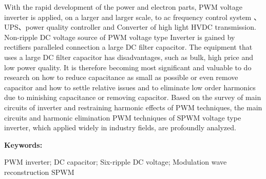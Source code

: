     
\newpage
     \thispagestyle{fancy}
    \begin{enabstract}
        \begin{spacing}{1.5}
            \justify
          \qquad With the rapid development of the power and electron parts, PWM voltage inverter is 
        applied, on a larger and larger scale, to ac frequency control system 、UPS、power 
        quality controller and Converter of high light HVDC transmission. Non-ripple DC voltage 
        source of PWM voltage type Inverter is gained by rectifiers paralleled connection a large 
        DC filter capacitor. The equipment that uses a large DC filter capacitor has disadvantages, 
        such as bulk, high price and low power quality. It is therefore becoming most significant 
        and valuable to do research on how to reduce capacitance as small as possible or even 
        remove capacitor and how to settle relative issues and to eliminate low order harmonics 
        due to minishing capacitance or removing capacitor. Based on the survey of main circuits 
        of inverter and restraining harmonic effects of PWM techniques, the main circuits and 
        harmonic elimination PWM techniques of SPWM voltage type inverter, which applied widely 
        in industry fields, are profoundly analyzed.
        
        \end{spacing}
        \vspace{1\baselineskip}
    \noindent \textbf{Keywords:}
    \parbox[t]{29.9em}{PWM inverter; DC capacitor; Six-ripple DC voltage; Modulation wave reconstruction SPWM}
\end{enabstract}


\newpage
\tableofcontents
\clearpage